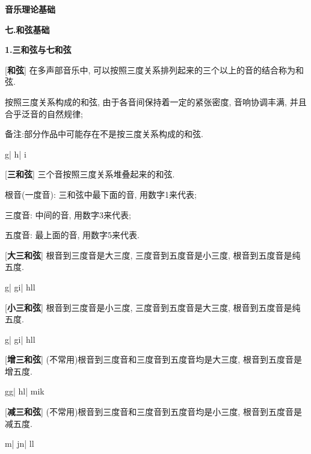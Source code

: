 

\begin{center} 
 \Large \textbf{音乐理论基础}\par
 \textbf{七.和弦基础}
\end{center}

\large 
\begin{center}
 \textbf{1.三和弦与七和弦}\\
\end{center}

[\textbf{和弦}] 在多声部音乐中, 可以按照三度关系排列起来的三个以上的音的结合称为和弦.\par
\qquad 按照三度关系构成的和弦, 由于各音间保持着一定的紧张密度, 音响协调丰满, 并且合乎泛音的自然规律;\par
\qquad 备注:部分作品中可能存在不是按三度关系构成的和弦.\par
\startextract
\Notes {}\wh g\en\bar
\Notes {}\wh h\en\bar
\Notes {}\wh i\en
\zendextract

[\textbf{三和弦}] 三个音按照三度关系堆叠起来的和弦.\par
\qquad 根音(一度音): 三和弦中最下面的音, 用数字1来代表;\par
\qquad 三度音: 中间的音, 用数字3来代表;\par
\qquad 五度音: 最上面的音, 用数字5来代表.\par

[\textbf{大三和弦}] 根音到三度音是大三度, 三度音到五度音是小三度, 根音到五度音是纯五度.\par
\startextract
\Notes {}\wh g\en\bar
\Notes \sh g\wh i\en\bar
\Notes \fl h\fl l\wh l\en
\zendextract

[\textbf{小三和弦}] 根音到三度音是小三度, 三度音到五度音是大三度, 根音到五度音是纯五度.\par
\startextract
\Notes {}\wh g\en\bar
\Notes \sh g\wh i\en\bar
\Notes \fl h\fl l\wh l\en
\zendextract

[\textbf{增三和弦}] (不常用)根音到三度音和三度音到五度音均是大三度, 根音到五度音是增五度.\par
\startextract
\Notes \sh g\wh g\en\bar
\Notes \fl h\wh l\en\bar
\Notes \sh m\fl i\wh k\en
\zendextract

[\textbf{减三和弦}] (不常用)根音到三度音和三度音到五度音均是小三度, 根音到五度音是减五度.\par
\startextract
\Notes {}\wh m\en\bar
\Notes \sh j\wh n\en\bar
\Notes \fl l\wh l\en
\zendextract

